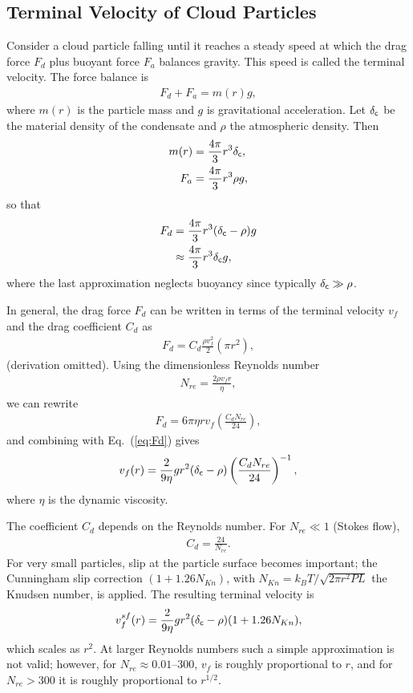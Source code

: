 \subsection*{Terminal Velocity of Cloud Particles}\label{ss:termv}

Consider a cloud particle falling until it reaches a steady speed at which the drag force $F_d$ plus buoyant force $F_a$ balances gravity.  
This speed is called the terminal velocity. The force balance is
\begin{align}
F_d + F_a = m (r) g,
\end{align}
where $m(r)$ is the particle mass and $g$ is gravitational acceleration.  
Let $\delta_{\mathsf{c}}$ be the material density of the condensate and $\rho$ the atmospheric density. Then
\begin{align}
m(r) &= \frac{4 \pi}{3} r^3 \delta_{\mathsf{c}}, \\
F_a &= \frac{4 \pi}{3} r^3 \rho g,
\end{align}
so that
\begin{align}
\label{eq:Fd}
F_d &= \frac{4 \pi}{3} r^3 (\delta_{\mathsf{c}} - \rho) g \\
&\approx  \frac{4 \pi}{3} r^3 \delta_{\mathsf{c}} g,
\end{align}
where the last approximation neglects buoyancy since typically $\delta_{\mathsf{c}} \gg \rho$.

In general, the drag force $F_d$ can be written in terms of the terminal velocity $v_f$ and the drag coefficient $C_d$ as
\begin{align}
F_d = C_d \frac{\rho v_f^2}{2} (\pi r^2),
\end{align}
(derivation omitted).  
Using the dimensionless Reynolds number
\begin{align}
\label{eq:Reynolds}
N_{re} = \frac{2 \rho v_f r}{\eta},
\end{align}
we can rewrite
\begin{align}
F_d = 6 \pi \eta r v_f \left( \frac{C_d N_{re}}{24} \right),
\end{align}
and combining with Eq.~(\ref{eq:Fd}) gives
\begin{align}
\label{eq:gcloud}
v_f(r) = \frac{2}{9 \eta}  g r^2 (\delta_{\mathsf{c}} - \rho) \left( \frac{C_d N_{re}}{24} \right)^{-1},
\end{align}
where $\eta$ is the dynamic viscosity.

The coefficient $C_d$ depends on the Reynolds number.  
For $N_{re} \ll 1$ (Stokes flow),
\begin{align}
C_d = \frac{24}{N_{re}}.
\end{align}
For very small particles, slip at the particle surface becomes important; the Cunningham slip correction $(1+1.26 N_{Kn})$, with $N_{Kn}=k_B T/\sqrt{2 \pi r^2 P L}$ the Knudsen number, is applied.  
The resulting terminal velocity is
\begin{align}
\label{eq:sfcloud}
v_f^{sf}(r) = \frac{2}{9 \eta} g r^2 (\delta_{\mathsf{c}} - \rho) (1+1.26 N_{Kn}),
\end{align}
which scales as $r^2$.  
At larger Reynolds numbers such a simple approximation is not valid; however, for $N_{re} \approx 0.01$--$300$, $v_f$ is roughly proportional to $r$, and for $N_{re} > 300$ it is roughly proportional to $r^{1/2}$.

